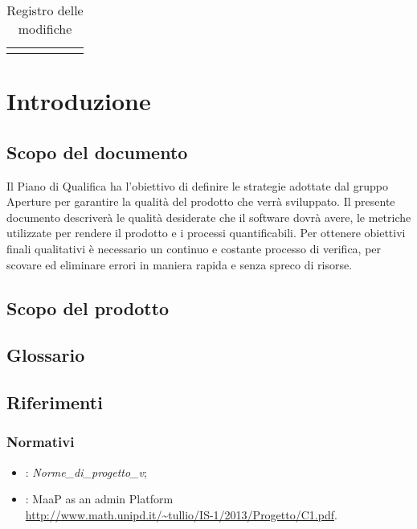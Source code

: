 \begin{center}
\begin{longtable}{|c|c|c|p{0.5\linewidth}|}
\bottomrule
\caption{Registro delle modifiche}
\label{tab:changelog}
\end{longtable}
\end{center}

\newpage
\tableofcontents

\newpage
\listoftables
\listoffigures

\newpage
\section{Introduzione}%
\label{1.0}
\subsection{Scopo del documento}%
\label{1.1}
Il Piano di Qualifica ha l'obiettivo di definire le strategie adottate dal gruppo Aperture  per garantire la qualità del prodotto che verrà sviluppato.
Il presente documento descriverà le qualità desiderate che il software dovrà avere, le metriche utilizzate per rendere il prodotto e i processi quantificabili. Per ottenere obiettivi finali qualitativi è necessario un continuo e costante processo di verifica, per scovare ed eliminare errori in maniera rapida e senza spreco di risorse.

\subsection{Scopo del prodotto}%
\label{1.2}
\Prodotto{}

\subsection{Glossario}%
\label{1.3}
\Glossario{}

\subsection{Riferimenti} %
\label{1.4}
\subsubsection{Normativi}
\label{1.4.1}
\begin{itemize}
\item {}: \emph{Norme\_di\_progetto\_v\versioneNormeDiProgetto{}};\\
\item {}: MaaP as an admin Platform\\
\url{http://www.math.unipd.it/~tullio/IS-1/2013/Progetto/C1.pdf}.
\end{itemize}
